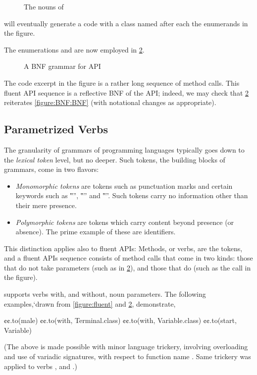 \begin{figure}[htb]
  \caption{The nouns of \Fajita}
  \label{figure:Nouns}
\end{figure}
  \Fajita will eventually generate a code with
  a class named after each the enumerands in the figure.

The enumerations  and 
  are now employed in \cref{figure:BNF:fluent}.

\begin{figure}[htb]
  \caption{A BNF grammar for \Fajita API}
  \label{figure:BNF:fluent}
\end{figure}

The code excerpt in the figure is a rather long
sequence of method calls.
This fluent API sequence is a reflective BNF
of the \Fajita API;
indeed, we may check that \cref{figure:BNF:fluent} reiterates \cref{figure:BNF:BNF}
(with notational changes as appropriate).

\subsection{Parametrized Verbs}
The granularity of grammars of programming languages typically goes down to the \emph{lexical token} level,
but no deeper.
Such tokens, the building blocks of grammars, come in two flavors:
\begin{itemize}
  \item \emph{Monomorphic tokens} are tokens such as punctuation marks and
        certain keywords such as ‟”, ‟” and ‟”.
        Such tokens carry no information other than their mere presence.
  \item \emph{Polymorphic tokens} are tokens which carry content beyond
        presence (or absence). The prime example of these are identifiers.
\end{itemize}

This distinction applies also to fluent APIs:
Methods, or verbs, are the tokens, and a fluent APIs sequence consists of
method calls that come in two kinds: those that do not take parameters (such as  in \cref{figure:BNF:fluent}),
and those that do (such as the call  in the figure).

\Fajita supports verbs with, and without, noun parameters.
The following examples,`drawn from \cref{figure:fluent} and \cref{figure:BNF:fluent},
demonstrate,
\begin{JAVA}
  ¢¢.to(male)
  ¢¢.to(with, Terminal.class)
  ¢¢.to(with, Variable.class)
  ¢¢.to(start, Variable)\end{JAVA}
(The above is made possible with minor \Java language trickery,
  involving overloading and use of variadic signatures,
  with respect to function name .
Same trickery was applied to verbs , and .)
